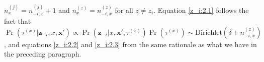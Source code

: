 $n_x^{(j)} = n_{-i,x}^{(j)} + 1$ and $n_x^{(z)} = n_{-i,x}^{(z)}$ for all $z \ne
z_i$.   Equation \eqref{z_i:2.1} follows the fact that
$\Pr(\tau^{(x)}|\mathbf{z}_{-i}, x, \mathbf{x}') \propto \Pr(\mathbf{z}_{-i}|x,
\mathbf{x}', \tau^{(x)}) \Pr(\tau^{(x)}) \sim \mathrm{Dirichlet}(\delta +
n_{-i,x}^{(z)})$, and equations \eqref{z_i:2.2} and \eqref{z_i:2.3} from the
same rationale as what we have in the preceding paragraph.

